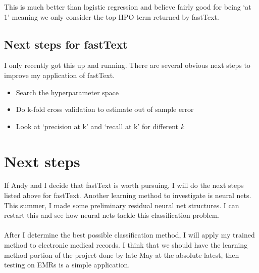 \documentclass{ws-procs11x85}
\begin{document}
This is much better than logistic regression and believe fairly good for being `at 1' meaning we only consider the top HPO term returned by fastText. 
\subsection{Next steps for fastText}
I only recently got this up and running. There are several obvious next steps to improve my application of fastText. 
\begin{itemize}
\item Search the hyperparameter space
\item Do k-fold cross validation to estimate out of sample error 
\item Look at `precision at k' and `recall at k' for different \textit{k}
\end{itemize}

\section{Next steps}
If Andy and I decide that fastText is worth pursuing, I will do the next steps listed above for fastText. Another learning method to investigate is neural nets. This summer, I made some preliminary residual neural net structures. I can restart this and see how neural nets tackle this classification problem. \\ \\ 
After I determine the best possible classification method, I will apply my trained method to electronic medical records. I think that we should have the learning method portion of the project done by late May at the absolute latest, then testing on EMRs is a simple application. 




\end{document}

